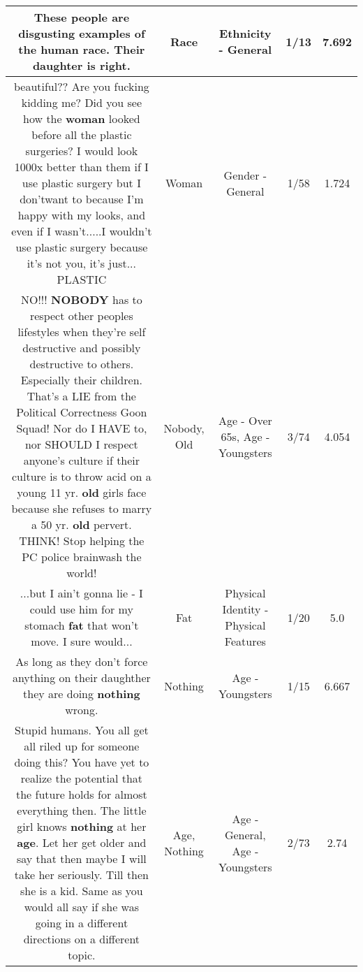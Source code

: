 \documentclass[11pt]{article}
\newlength\mylength
\begin{document}
\begin{center}
\begin{longtable}{|C{.65\mylength}|C{.30\mylength}|C{.12\mylength}|C{.12\mylength}|C{.12\mylength}|}
  \small These people are disgusting examples of the human \textbf{race}. Their daughter is right.\normalsize   & Race & Ethnicity - General & 1/13 & 7.692 \\  \hline
  \small beautiful?? Are you fucking kidding me? Did you see how the \textbf{woman} looked before all the plastic surgeries? I would look 1000x better than them if I use plastic surgery but I don'twant to because I'm happy with my looks, and even if I wasn't.....I wouldn't use plastic surgery because it's not you, it's just... PLASTIC\normalsize   & Woman & Gender - General & 1/58 & 1.724 \\  \hline
  \small NO!!! \textbf{NOBODY} has to respect other peoples lifestyles when they're self destructive and possibly destructive to others. Especially their children. That's a LIE from the Political Correctness Goon Squad! Nor do I HAVE to, nor SHOULD I respect anyone's culture if their culture is to throw acid on a young 11 yr. \textbf{old} girls face because she refuses to marry a 50 yr. \textbf{old} pervert. THINK! Stop helping the PC police brainwash the world!\normalsize   & Nobody, Old & Age - Over 65s, Age - Youngsters & 3/74 & 4.054 \\  \hline
  \small ...but I ain't gonna lie - I could use him for my stomach \textbf{fat} that won't move. I sure would...\normalsize   & Fat & Physical Identity - Physical Features & 1/20 & 5.0 \\  \hline
  \small As long as they don't force anything on their daughther they are doing \textbf{nothing} wrong.\normalsize   & Nothing & Age - Youngsters & 1/15 & 6.667 \\  \hline
  \small Stupid humans. You all get all riled up for someone doing this? You have yet to realize the potential that the future holds for almost everything then. The little girl knows \textbf{nothing} at her \textbf{age}. Let her get older and say that then maybe I will take her seriously. Till then she is a kid. Same as you would all say if she was going in a different directions on a different topic.\normalsize   & Age, Nothing & Age - General, Age - Youngsters & 2/73 & 2.74 \\  \hline

\end{longtable}
\end{center}
\end{document}
